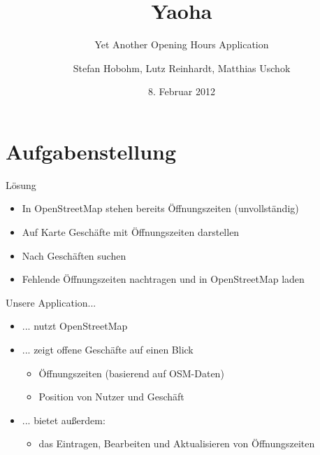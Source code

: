 \documentclass[hyperref]{beamer}
\title{Yaoha}
\subtitle{Yet Another Opening Hours Application}
\author[Hobohm, Reinhardt, Uschok]{Stefan Hobohm, Lutz Reinhardt, Matthias Uschok}
\institute[TU Braunschweig, IBR]{Technische Universität Braunschweig, IBR}
\date{8. Februar 2012}
\begin{document}
\frame[plain]{\titlepage}
\section{Aufgabenstellung}



\begin{frame}{Lösung}
\begin{itemize}
\item In OpenStreetMap stehen bereits Öffnungszeiten (unvollständig)
\item Auf Karte Geschäfte mit Öffnungszeiten darstellen
\item Nach Geschäften suchen
\item Fehlende Öffnungszeiten nachtragen und in OpenStreetMap laden
\end{itemize}
\end{frame}

\begin{frame}{Unsere Application...}
	\begin{itemize}
	\item ... nutzt OpenStreetMap
	\item ... zeigt offene Geschäfte auf einen Blick
			\begin{itemize}
			\item Öffnungszeiten (basierend auf OSM-Daten)
			\item Position von Nutzer und Geschäft						\end{itemize}
	\item ... bietet außerdem:
	\begin{itemize}
		\item das Eintragen, Bearbeiten und Aktualisieren von Öffnungszeiten
	\end{itemize}
\end{itemize}
\end{frame}
\end{document}
